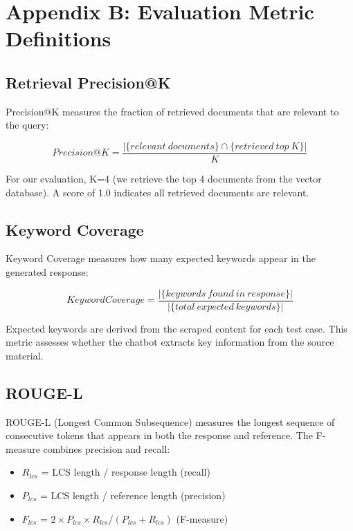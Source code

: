 \documentclass[conference]{IEEEtran}
\begin{document}
\section*{Appendix B: Evaluation Metric Definitions}

\subsection*{Retrieval Precision@K}
Precision@K measures the fraction of retrieved documents that are relevant to the query:

\begin{equation}
Precision@K = \frac{| \{ relevant\ documents\} \cap \{ retrieved\ top\ K\} |}{K}
\end{equation}

For our evaluation, K=4 (we retrieve the top 4 documents from the vector database). A score of 1.0 indicates all retrieved documents are relevant.

\subsection*{Keyword Coverage}
Keyword Coverage measures how many expected keywords appear in the generated response:

\begin{equation}
KeywordCoverage = \frac{| \{ keywords\ found\ in\ response\} |}{| \{ total\ expected\ keywords\} |}
\end{equation}

Expected keywords are derived from the scraped content for each test case. This metric assesses whether the chatbot extracts key information from the source material.

\subsection*{ROUGE-L}
ROUGE-L (Longest Common Subsequence) measures the longest sequence of consecutive tokens that appears in both the response and reference. The F-measure combines precision and recall:

\begin{itemize}
    \item $R_{lcs}$ = LCS length / response length (recall)
    \item $P_{lcs}$ = LCS length / reference length (precision)
    \item $F_{lcs}$ = $2 \times P_{lcs} \times R_{lcs} / (P_{lcs} + R_{lcs})$ (F-measure)
\end{itemize}
\end{document}
